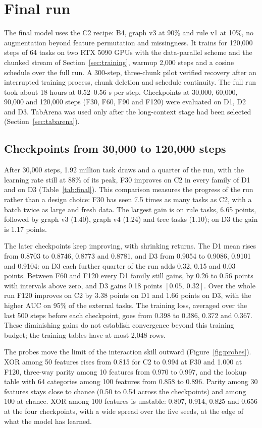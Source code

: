 \documentclass[11pt]{article}
\begin{document}
\section{Final run}
\label{sec:final}

The final model uses the C2 recipe: B4, graph v3 at 90\% and rule v1 at 10\%, no augmentation beyond
feature permutation and missingness. It trains for 120,000 steps of 64 tasks on two RTX 5090 GPUs with
the data-parallel scheme and the chunked stream of Section~\ref{sec:training}, warmup 2,000 steps and a
cosine schedule over the full run. A 300-step, three-chunk pilot verified recovery after an interrupted
training process, chunk deletion and schedule continuity. The full run took about 18 hours at
0.52--0.56 s per step. Checkpoints at 30,000, 60,000, 90,000 and 120,000 steps (F30, F60, F90 and F120)
were evaluated on D1, D2 and D3. TabArena was used only after the long-context stage had been selected
(Section~\ref{sec:tabarena}).

\subsection{Checkpoints from 30,000 to 120,000 steps}
After 30,000 steps, 1.92 million task draws and a quarter of the run, with the learning rate still at
88\% of its peak, F30 improves on C2 in every family of D1 and on D3 (Table~\ref{tab:final}). This
comparison measures the progress of the run rather than a design choice: F30 has seen 7.5 times as
many tasks as C2, with a batch twice as large and fresh data. The largest gain is on rule tasks, 6.65
points, followed by graph v3 (1.40), graph v4 (1.24) and tree tasks (1.10); on D3 the gain is 1.17
points.

The later checkpoints keep improving, with shrinking returns. The D1 mean rises from 0.8703 to 0.8746,
0.8773 and 0.8781, and D3 from 0.9054 to 0.9086, 0.9101 and 0.9104: on D3 each further quarter of the
run adds 0.32, 0.15 and 0.03 points. Between F60 and F120 every D1 family still gains, by 0.26 to 0.56
points with intervals above zero, and D3 gains 0.18 points $[0.05,\ 0.32]$. Over the whole run F120
improves on C2 by 3.38 points on D1 and 1.66 points on D3, with the higher AUC on 95\% of the external
tasks. The training loss, averaged over the last 500 steps before each checkpoint, goes from 0.398 to
0.386, 0.372 and 0.367. These diminishing gains do not establish convergence beyond this training budget;
the training tables have at most 2,048 rows.

The probes move the limit of the interaction skill outward (Figure~\ref{fig:probes}). XOR among 50
features rises from 0.815 for C2 to 0.994 at F30 and 1.000 at F120, three-way parity among 10 features
from 0.970 to 0.997, and the lookup table with 64 categories among 100 features from 0.858 to 0.896.
Parity among 30 features stays close to chance (0.50 to 0.54 across the checkpoints) and among 100 at
chance. XOR among 100 features is unstable: 0.807, 0.914, 0.825 and 0.656 at the four checkpoints, with
a wide spread over the five seeds, at the edge of what the model has learned.
\end{document}
